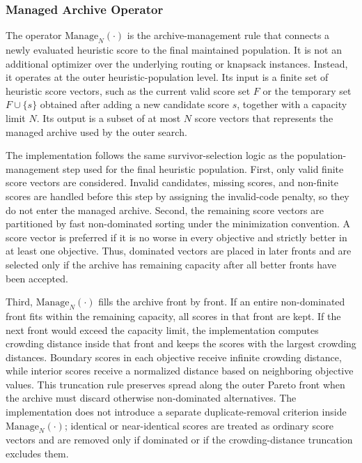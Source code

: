 \documentclass[../main.tex]{subfiles}
\begin{document}
\subsubsection{Managed Archive Operator}

The operator $\mathrm{Manage}_N(\cdot)$ is the archive-management rule that connects a newly evaluated heuristic score to the final maintained population. It is not an additional optimizer over the underlying routing or knapsack instances. Instead, it operates at the outer heuristic-population level. Its input is a finite set of heuristic score vectors, such as the current valid score set $F$ or the temporary set $F\cup\{s\}$ obtained after adding a new candidate score $s$, together with a capacity limit $N$. Its output is a subset of at most $N$ score vectors that represents the managed archive used by the outer search.

The implementation follows the same survivor-selection logic as the population-management step used for the final heuristic population. First, only valid finite score vectors are considered. Invalid candidates, missing scores, and non-finite scores are handled before this step by assigning the invalid-code penalty, so they do not enter the managed archive. Second, the remaining score vectors are partitioned by fast non-dominated sorting under the minimization convention. A score vector is preferred if it is no worse in every objective and strictly better in at least one objective. Thus, dominated vectors are placed in later fronts and are selected only if the archive has remaining capacity after all better fronts have been accepted.

Third, $\mathrm{Manage}_N(\cdot)$ fills the archive front by front. If an entire non-dominated front fits within the remaining capacity, all scores in that front are kept. If the next front would exceed the capacity limit, the implementation computes crowding distance inside that front and keeps the scores with the largest crowding distances. Boundary scores in each objective receive infinite crowding distance, while interior scores receive a normalized distance based on neighboring objective values. This truncation rule preserves spread along the outer Pareto front when the archive must discard otherwise non-dominated alternatives. The implementation does not introduce a separate duplicate-removal criterion inside $\mathrm{Manage}_N(\cdot)$; identical or near-identical scores are treated as ordinary score vectors and are removed only if dominated or if the crowding-distance truncation excludes them.
\end{document}
